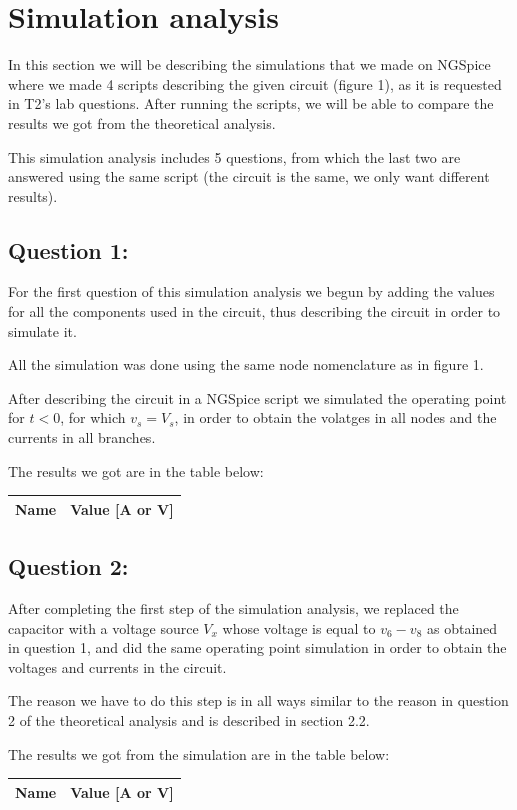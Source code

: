 \section{Simulation analysis}
\label{sec:simulation}

In this section we will be describing the simulations that we made on NGSpice where we made 4 scripts describing the given circuit (figure 1), as it is requested in T2's lab questions. After running the scripts, we will be able to compare the results we got from the theoretical analysis. \par
This simulation analysis includes 5 questions, from which the last two are answered using the same script (the circuit is the same, we only want different results).

\subsection{Question 1: }
For the first question of this simulation analysis we begun by adding the values for all the components used in the circuit, thus describing the circuit in order to simulate it. \par
All the simulation was done using the same node nomenclature as in figure 1. \par
After describing the circuit in a NGSpice script we simulated the operating point for $t<0$, for which $v_s=V_s$, in order to obtain the volatges in all nodes and the currents in all branches.\par
The results we got are in the table below:
\begin{table}[H]
  \centering
  \begin{tabular}{|l|r|}
    \hline    
    {\bf Name} & {\bf Value [A or V]} \\ \hline
    
  \end{tabular}
  \label{tab:op1}
\end{table}

\subsection{Question 2: }
After completing the first step of the simulation analysis, we replaced the capacitor with a voltage source $V_x$ whose voltage is equal to $v_6-v_8$ as obtained in question 1, and did the same operating point simulation in order to obtain the voltages and currents in the circuit. \par
The reason we have to do this step is in all ways similar to the reason in question 2 of the theoretical analysis and is described in section 2.2. \par
The results we got from the simulation are in the table below:
\begin{table}[H]
  \centering
  \begin{tabular}{|l|r|}
    \hline    
    {\bf Name} & {\bf Value [A or V]} \\ \hline
    
  \end{tabular}
  \label{tab:op2}
\end{table}

